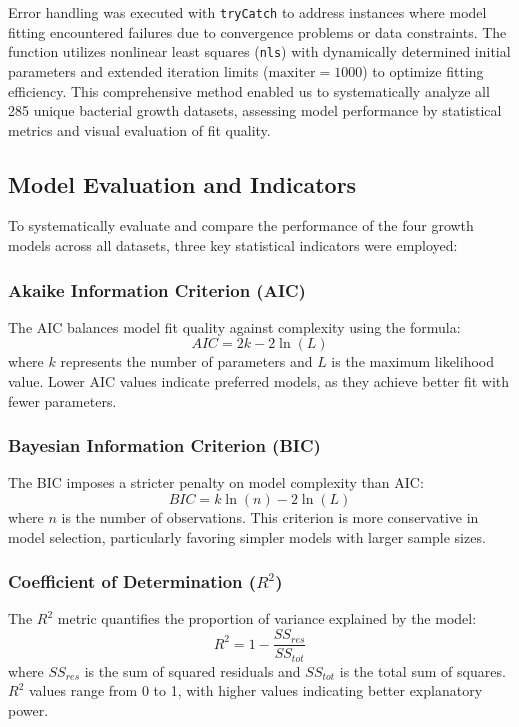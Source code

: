 \documentclass[11pt]{article}
\begin{document}
Error handling was executed with \texttt{tryCatch} to address instances where model fitting encountered failures due to convergence problems or data constraints. The function utilizes nonlinear least squares (\texttt{nls}) with dynamically determined initial parameters and extended iteration limits ($\text{maxiter} = 1000$) to optimize fitting efficiency. This comprehensive method enabled us to systematically analyze all 285 unique bacterial growth datasets, assessing model performance by statistical metrics and visual evaluation of fit quality.

\subsection{Model Evaluation and Indicators}
To systematically evaluate and compare the performance of the four growth models across all datasets, three key statistical indicators were employed:

\subsubsection{Akaike Information Criterion (AIC)}
The AIC balances model fit quality against complexity using the formula:
\begin{equation}
AIC = 2k - 2 \ln(L)
\end{equation}
where $k$ represents the number of parameters and $L$ is the maximum likelihood value. Lower AIC values indicate preferred models, as they achieve better fit with fewer parameters.

\subsubsection{Bayesian Information Criterion (BIC)}
The BIC imposes a stricter penalty on model complexity than AIC:
\begin{equation}
BIC = k \ln(n) - 2 \ln(L)
\end{equation}
where $n$ is the number of observations. This criterion is more conservative in model selection, particularly favoring simpler models with larger sample sizes.

\subsubsection{Coefficient of Determination ($R^2$)}
The $R^2$ metric quantifies the proportion of variance explained by the model:
\begin{equation}
R^2 = 1 - \frac{SS_{res}}{SS_{tot}}
\end{equation}
where $SS_{res}$ is the sum of squared residuals and $SS_{tot}$ is the total sum of squares. $R^2$ values range from 0 to 1, with higher values indicating better explanatory power.
\end{document}
